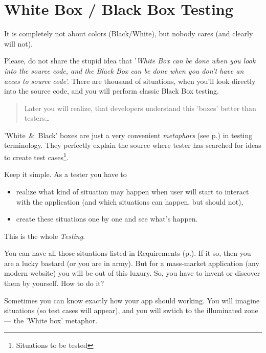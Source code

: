 \section{White Box / Black Box Testing}
\label{sec:White Box Black Box Testing}

It is completely not about colors (Black/White), but nobody cares (and clearly will not).

Please, do not share the stupid idea that '\textit{White Box can be done when you look into the source code, and the Black Box can be done when you don't have an acces to source code}'. There are thousand of situations, when you'll look directly into the source code, and you will perform classic Black Box testing.

\begin{quote}
 Later you will realize, that developers understand this 'boxes' better than testers\ldots
\end{quote} 

 'White~\&~Black' boxes are just a very convenient \emph{metaphors} (see p.\pageref{sec:Metaphor}) in testing terminology. They perfectly explain the source where tester has searched for ideas to create test cases\footnote{Situations to be tested}.

Keep it simple.  As a tester you have to 
\begin{itemize}
\item 
realize what kind of situation may happen when user will start to interact with the application (and which situations can happen, but should not), 
\item 
create these situations one by one and see what's happen.                                                                                                                                                                                                              \end{itemize}

This is the whole \emph{Testing}.

You can have all those situations listed in Requirements (p.\pageref{sec:Requirement}). If it so, then you are a lucky bastard (or you are in army). But for a mass-market application (any modern website) you will be out of this luxury. So, you have to invent or discover them by yourself. How to do it?

Sometimes you can know exactly how your app should working. You will imagine situations (so test cases will appear), and you will swtich to the illuminated zone — the 'White box' metaphor.

